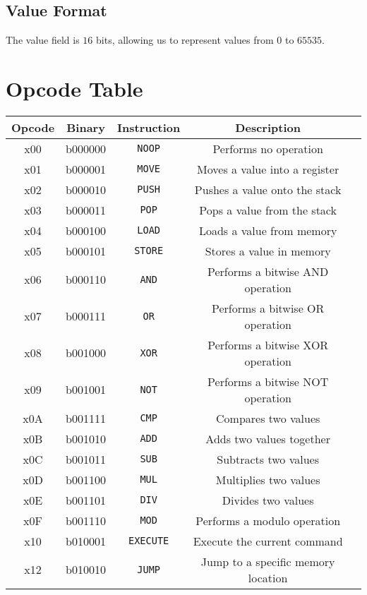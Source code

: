 \documentclass[12pt,a4paper]{article}
\begin{document}
\subsection{Value Format}

The value field is $16$ bits, allowing us to represent values from $0$ to
$65535$.

\section{Opcode Table}

\begin{center}
\begin{tabular}{ c c c c c }
    \textbf{Opcode} & \textbf{Binary} & \textbf{Instruction} & \textbf{Description} \\
    \hline
    x00 & b000000 & \texttt{NOOP} & Performs no operation \\

    \hline

    x01 & b000001 & \texttt{MOVE} & Moves a value into a register \\

    \hline

    x02 & b000010 & \texttt{PUSH} & Pushes a value onto the stack \\
    x03 & b000011 & \texttt{POP} & Pops a value from the stack \\
    x04 & b000100 & \texttt{LOAD} & Loads a value from memory \\
    x05 & b000101 & \texttt{STORE} & Stores a value in memory \\

    \hline

    x06 & b000110 & \texttt{AND} & Performs a bitwise AND operation \\
    x07 & b000111 & \texttt{OR} & Performs a bitwise OR operation \\
    x08 & b001000 & \texttt{XOR} & Performs a bitwise XOR operation \\
    x09 & b001001 & \texttt{NOT} & Performs a bitwise NOT operation \\
    x0A & b001111 & \texttt{CMP} & Compares two values \\

    \hline

    x0B & b001010 & \texttt{ADD} & Adds two values together \\
    x0C & b001011 & \texttt{SUB} & Subtracts two values \\
    x0D & b001100 & \texttt{MUL} & Multiplies two values \\
    x0E & b001101 & \texttt{DIV} & Divides two values \\
    x0F & b001110 & \texttt{MOD} & Performs a modulo operation \\

    \hline

    x10 & b010001 & \texttt{EXECUTE} & Execute the current command \\
    x12 & b010010 & \texttt{JUMP} & Jump to a specific memory location \\
\end{tabular}
\end{center}
\end{document}
